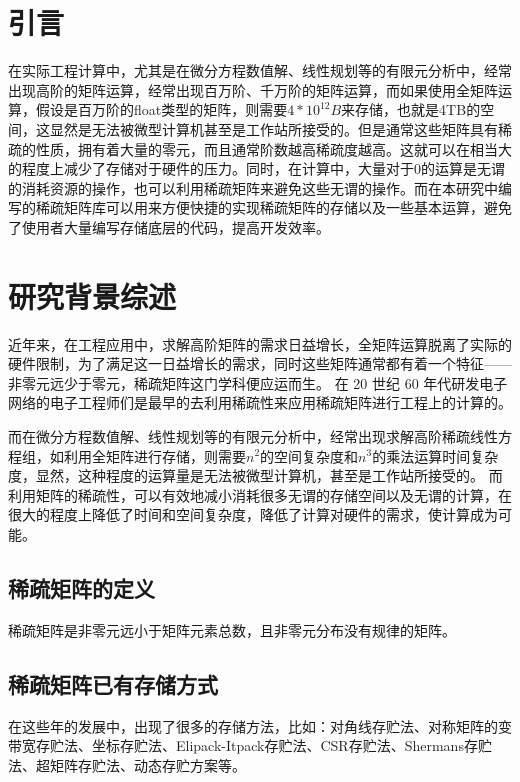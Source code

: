 \chapter{引言}
 在实际工程计算中，尤其是在微分方程数值解、线性规划等的有限元分析中，经常出现高阶的矩阵运算，经常出现百万阶、千万阶的矩阵运算，而如果使用全矩阵运算，假设是百万阶的float类型的矩阵，则需要$4*10^{12}B$来存储，也就是4TB的空间，这显然是无法被微型计算机甚至是工作站所接受的。但是通常这些矩阵具有稀疏的性质，拥有着大量的零元，而且通常阶数越高稀疏度越高。这就可以在相当大的程度上减少了存储对于硬件的压力。同时，在计算中，大量对于0的运算是无谓的消耗资源的操作，也可以利用稀疏矩阵来避免这些无谓的操作。而在本研究中编写的稀疏矩阵库可以用来方便快捷的实现稀疏矩阵的存储以及一些基本运算，避免了使用者大量编写存储底层的代码，提高开发效率。


\chapter{研究背景综述}
近年来，在工程应用中，求解高阶矩阵的需求日益增长，全矩阵运算脱离了实际的硬件限制，为了满足这一日益增长的需求，同时这些矩阵通常都有着一个特征——非零元远少于零元，稀疏矩阵这门学科便应运而生。
在 20 世纪 60 年代研发电子网络的电子工程师们是最早的去利用稀疏性来应用稀疏矩阵进行工程上的计算的。
\cite{YousefSaad2003applied}

而在微分方程数值解、线性规划等的有限元分析中，经常出现求解高阶稀疏线性方程组，如利用全矩阵进行存储，则需要$n^2$的空间复杂度和$n^3$的乘法运算时间复杂度，显然，这种程度的运算量是无法被微型计算机，甚至是工作站所接受的。
而利用矩阵的稀疏性，可以有效地减小消耗很多无谓的存储空间以及无谓的计算，在很大的程度上降低了时间和空间复杂度，降低了计算对硬件的需求，使计算成为可能。


\section{稀疏矩阵的定义}
稀疏矩阵是非零元远小于矩阵元素总数，且非零元分布没有规律的矩阵。
\cite{YousefSaad2003applied}

\section{稀疏矩阵已有存储方式}
在这些年的发展中，出现了很多的存储方法，比如：对角线存贮法、对称矩阵的变带宽存贮法、坐标存贮法、Elipack-Itpack存贮法、CSR存贮法、Shermans存贮法、超矩阵存贮法、动态存贮方案等。\cite{sparseMatrixTech2006Zhangsun}


